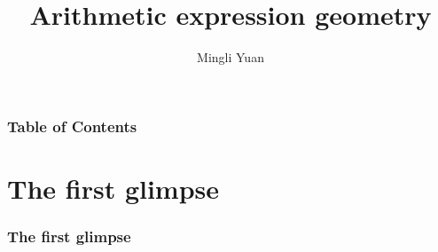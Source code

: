 \documentclass[aspectratio=169]{beamer}
\title{Arithmetic expression geometry}
\author[Author] {Mingli Yuan}
\begin{document}
\pgfplotsset{compat=1.18}

\begin{frame}
\maketitle
\end{frame}

\begin{frame}
\frametitle{Table of Contents}
\tableofcontents
\end{frame}

\section{The first glimpse}

\begin{frame}
\frametitle{The first glimpse}
\begin{figure}[ht]\centering
{}
\end{figure}
\end{frame}
\end{document}
